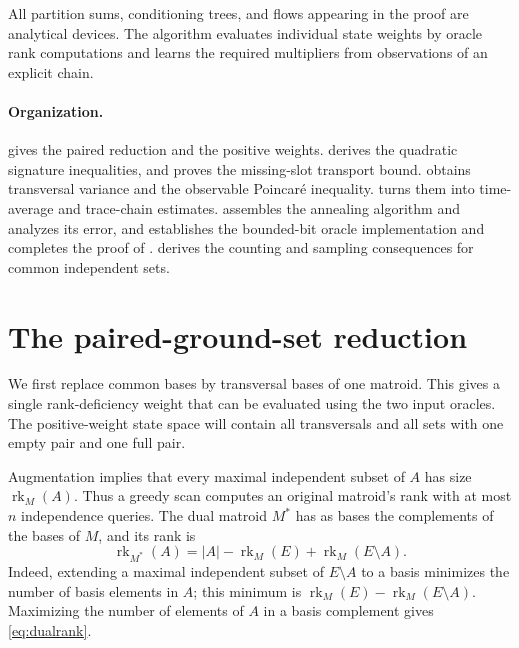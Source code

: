 \documentclass[11pt]{article}
\theoremstyle{definition}
\newcommand{\rank}{\operatorname{rk}}
\begin{document}
All partition sums, conditioning trees, and flows appearing in the proof
are analytical devices.  The algorithm evaluates individual state weights
by oracle rank computations and learns the required multipliers from
observations of an explicit chain.

\paragraph{Organization.}
 gives the paired reduction and the positive weights.
 derives the quadratic signature inequalities, and
 proves the missing-slot transport bound.
 obtains transversal variance and the observable
Poincar\'e inequality.   turns them into
time-average and trace-chain estimates.
 assembles the annealing algorithm and analyzes its
error, and  establishes the bounded-bit oracle
implementation and completes the proof of .
 derives the counting and sampling consequences
for common independent sets.

\section{The paired-ground-set reduction}\label{sec:reduction}

We first replace common bases by transversal bases of one matroid.
This gives a single rank-deficiency weight that can be evaluated using
the two input oracles.  The positive-weight state space will contain
all transversals and all sets with one empty pair and one full pair.

Augmentation implies that every maximal independent subset of $A$ has
size $\rank_M(A)$.  Thus a greedy scan computes an original matroid's
rank with at most $n$ independence queries.  The dual matroid
$M^*$ has as bases the complements of the bases of $M$, and its rank is
\begin{equation}\label{eq:dualrank}
 \rank_{M^*}(A)=|A|-\rank_M(E)+\rank_M(E\setminus A).
\end{equation}
Indeed, extending a maximal independent subset of $E\setminus A$ to a
basis minimizes the number of basis elements in $A$; this minimum is
$\rank_M(E)-\rank_M(E\setminus A)$.  Maximizing the number of elements
of $A$ in a basis complement gives \eqref{eq:dualrank}.
\end{document}
